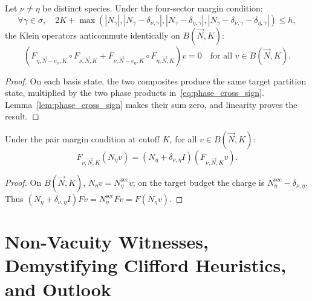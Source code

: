 \begin{theorem}
\label{thm:cross_anticommute}
Let $\nu \neq \eta$ be distinct species. Under the four-sector margin condition:
\begin{equation}
\label{eq:four_sector_margin}
\forall \gamma \in \sigma, \quad 2K + \max\left( |N_\gamma|, |N_\gamma - \delta_{\nu, \gamma}|, |N_\gamma - \delta_{\eta, \gamma}|, |N_\gamma - \delta_{\nu, \gamma} - \delta_{\eta, \gamma}| \right) \le h,
\end{equation}
the Klein operators anticommute identically on $B(\vec{N}, K)$:
\begin{equation}
\label{eq:cross_anticommute}
\left( F_{\eta, \vec{N}-e_\nu, K} \circ F_{\nu, \vec{N}, K} + F_{\nu, \vec{N}-e_\eta, K} \circ F_{\eta, \vec{N}, K} \right) v = 0 \quad \text{for all } v \in B(\vec{N}, K).
\end{equation}
\end{theorem}

\begin{proof}
On each basis state, the two composites produce the same target partition state, multiplied by the two phase products in~\eqref{eq:phase_cross_sign}. Lemma~\ref{lem:phase_cross_sign} makes their sum zero, and linearity proves the result.
\end{proof}

\begin{theorem}
\label{thm:number_shift}
Under the pair margin condition at cutoff $K$, for all $v \in B(\vec{N}, K)$:
\begin{equation}
\label{eq:number_shift}
    F_{\nu, \vec{N}, K} (N_\eta v) = (N_\eta + \delta_{\nu, \eta} I) (F_{\nu, \vec{N}, K} v).
\end{equation}
\end{theorem}

\begin{proof}
On $B(\vec{N},K)$, $N_\eta v=N_\eta^{\mathrm{sec}}v$; on the target budget the charge is $N_\eta^{\mathrm{sec}}-\delta_{\nu,\eta}$. Thus $(N_\eta+\delta_{\nu,\eta}I)Fv=N_\eta^{\mathrm{sec}}Fv=F(N_\eta v)$.
\end{proof}

\section{Non-Vacuity Witnesses, Demystifying Clifford Heuristics, and Outlook}


